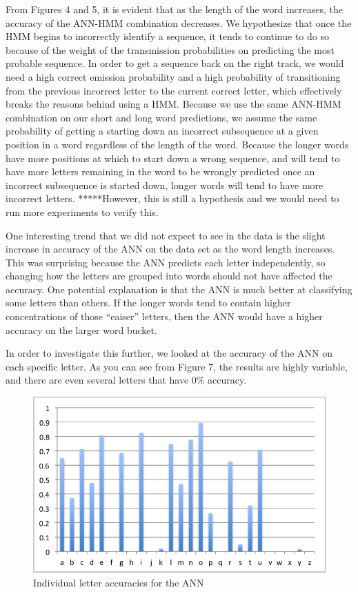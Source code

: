 \documentclass[11pt,a4paper,twocolumn]{article}
\begin{document}
From Figures 4 and 5, it is evident that as the length of the word increases, the accuracy of the
ANN-HMM combination decreases. We hypothesize that once the HMM begins to incorrectly identify a
sequence, it tends to continue to do so because of the weight of the transmission probabilities on
predicting the most probable sequence. In order to get a sequence back on the right track, we would
need a high correct emission probability and a high probability of transitioning from the previous
incorrect letter to the current correct letter, which effectively breaks the reasons behind using a
HMM. Because we use the same ANN-HMM combination on our short and long word predictions, we assume
the same probability of getting a starting down an incorrect subsequence at a given position in a
word regardless of the length of the word. Because the longer words have more positions at which to
start down a wrong sequence, and will tend to have more letters remaining in the word to be wrongly
predicted once an incorrect subsequence is started down, longer words will tend to have more
incorrect letters. *****However, this is still a hypothesis and we would need to run more
experiments to verify this.

One interesting trend that we did not expect to see in the data is the slight increase in accuracy
of the ANN on the data set as the word length increases. This was surprising because the ANN
predicts each letter independently, so changing how the letters are grouped into words should not
have affected the accuracy. One potential explanation is that the ANN is much better at classifying
some letters than others. If the longer words tend to contain higher concentrations of those
``eaiser'' letters, then the ANN would have a higher accuracy on the larger word bucket. 

In order to investigate this further, we looked at the accuracy of the ANN on each specific letter.
As you can see from Figure 7, the results are highly variable, and there are even several letters
that have 0\% accuracy.

\begin{figure}[h]
\centering
\caption{Individual letter accuracies for the ANN}
\includegraphics[scale=0.55]{img/letterPercentages.png}
\end{figure} 
\end{document}
